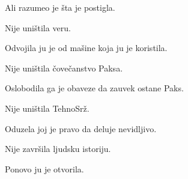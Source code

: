 \bigskip

Ali razumeo je šta je postigla.

\bigskip

Nije uništila veru.

Odvojila ju je od mašine koja ju je koristila.

\bigskip

Nije uništila čovečanstvo Paksa.

Oslobodila ga je obaveze da zauvek ostane Paks.

\bigskip

Nije uništila TehnoSrž.

Oduzela joj je pravo da deluje nevidljivo.

\bigskip

Nije završila ljudsku istoriju.

\bigskip

Ponovo ju je otvorila.